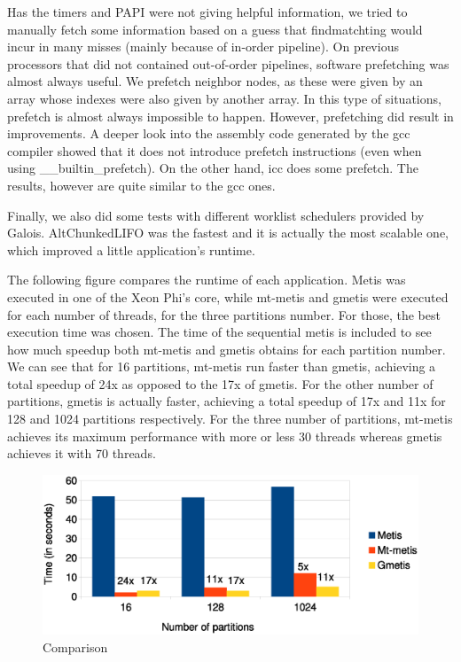 \documentclass[abstract=on,9pt,twocolumn]{scrartcl}
\begin{document}
Has the timers and PAPI were not giving helpful information, we tried to
manually fetch some information based on a guess that findmatchting
would incur in many misses (mainly because of in-order pipeline). On
previous processors that did not contained out-of-order pipelines,
software prefetching was almost always useful. 
We prefetch neighbor nodes, as these were given by an array whose
indexes were also given by another array. In this type of situations,
prefetch is almost always impossible to happen. 
However, prefetching did result in improvements.
A deeper look into the assembly code generated by the gcc compiler 
showed that it does not introduce prefetch instructions (even when using
\_\_builtin\_prefetch). On the other hand, icc does some prefetch. The results,
however are quite similar to the gcc ones.

Finally, we also did some tests with different worklist schedulers provided by
Galois. AltChunkedLIFO was the fastest and it is actually the most
scalable one, which improved a little application's runtime.


The following figure compares the runtime of each application. Metis was
executed in one of the Xeon Phi's core, while mt-metis and gmetis were
executed for each number of threads, for the three partitions number.
For those, the best execution time was chosen. The time of the
sequential metis is included to see how much speedup both mt-metis and
gmetis obtains for each partition number. We can see that for 16
partitions, mt-metis run faster than gmetis, achieving a total speedup
of 24x as opposed to the 17x of gmetis. For the other number of partitions,
gmetis is actually faster, achieving a total speedup of 17x and 11x for
128 and 1024 partitions respectively. For the three number of partitions, mt-metis
achieves its maximum performance with more or less 30 threads whereas
gmetis achieves it with 70 threads.

\begin{center}
\begin{figure}[htb]
    \includegraphics[width=\columnwidth]{img/comparison3.eps}
    \caption{Comparison}
    \label{img:comparison3}
\end{figure}
\end{center}
\end{document}
